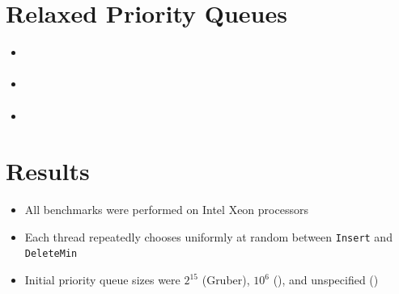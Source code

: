 \documentclass[usenames,dvipsnames]{beamer}
\begin{document}
\section{Relaxed Priority Queues} \label{sec:relaxed}

\begin{frame}{}


\begin{itemize}
\item
\end{itemize}
\end{frame}

\begin{frame}{}
\framesubtitle{\citeauthor{wimmer2013data}}

\begin{itemize}
\item
\end{itemize}
\end{frame}

\begin{frame}{}
\framesubtitle{\citeauthor{alistarhspraylist}}

\begin{itemize}
\item
\end{itemize}
\end{frame}

\section{Results} \label{sec:Results}

\begin{frame}{}

\begin{itemize}
\item All benchmarks were performed on Intel Xeon processors
\item Each thread repeatedly chooses uniformly at random between
      \lstinline|Insert| and \lstinline|DeleteMin|
\item Initial priority queue sizes were $2^{15}$ (Gruber), $10^6$ 
      (\citeauthor{alistarhspraylist}), and unspecified (\citeauthor{linden2013skiplist})
\end{itemize}
\end{frame}
\end{document}
